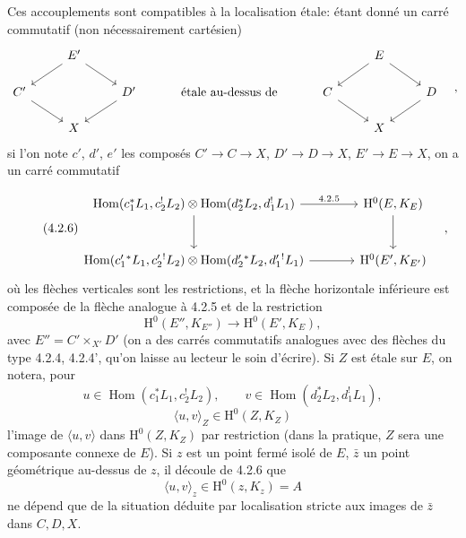 \documentclass[11pt]{article}
\renewcommand{\H}{\mathrm{H}}
\DeclareMathOperator{\Hom}{Hom}
\providecommand{\Hom}{\operatorname{Hom}}
\providecommand{\Hom}{\operatorname{Hom}}
\begin{document}
Ces accouplements sont compatibles à la localisation étale: étant donné un carré commutatif (non nécessairement cartésien)
\[
\begin{tikzcd}[column sep=2.5em,row sep=1.5em]
& E' \arrow[dl] \arrow[dr] & && & E \arrow[dl] \arrow[dr] & \\
C' \arrow[dr] && D' \arrow[dl] & \text{ étale au-dessus de } & C \arrow[dr] && D \arrow[dl] \\
& X &&&& X &
\end{tikzcd}\quad ,
\]
si l'on note $c'$, $d'$, $e'$ les composés $C'\to C\to X$, $D'\to D\to X$, $E'\to E\to X$, on a un carré commutatif


\begin{equation}
\tag{4.2.6}
\begin{tikzcd}[column sep=large,row sep=large]
\Hom(c_1^*L_1,c_2^!L_2)\otimes\Hom(d_2^*L_2,d_1^!L_1)
  \arrow[r,"4.2.5"] \arrow[d] &
\H^0(E,K_E)\arrow[d] \\
\Hom(c_1'{}^*L_1,c_2'{}^!L_2)\otimes\Hom(d_2'{}^*L_2,d_1'{}^!L_1)
  \arrow[r] &
\H^0(E',K_{E'})
\end{tikzcd}\quad,
\end{equation}
où les
flèches verticales sont les restrictions, et la flèche horizontale inférieure est composée de la flèche analogue à 4.2.5 et de la restriction
\[
\H^0(E'',K_{E''})\longrightarrow \H^0(E',K_E),
\]
avec $E''=C'\times_{X'}D'$ (on a des carrés commutatifs analogues avec des flèches du type 4.2.4, 4.2.4', qu'on laisse au lecteur le soin d'écrire). Si $Z$ est étale sur $E$, on notera, pour
\[
u\in\Hom(c_1^*L_1,c_2^!L_2),\qquad
v\in\Hom(d_2^*L_2,d_1^!L_1),
\]
\begin{equation}
\tag{4.2.7}
\langle u,v\rangle_Z\in \H^0(Z,K_Z)
\end{equation}
l'image de $\langle u,v\rangle$ dans $\H^0(Z,K_Z)$ par restriction (dans la pratique, $Z$ sera une composante connexe de $E$). Si $z$ est un point fermé isolé de $E$, $\bar z$ un point géométrique au-dessus de $z$, il découle de 4.2.6 que
\[
\langle u,v\rangle_z\in \H^0(z,K_z)=A
\]
ne dépend que de la situation déduite par localisation stricte aux images de $\bar z$ dans $C,D,X$.
\end{document}
